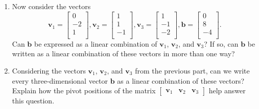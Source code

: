 \documentclass[12pt]{article}
\newcommand{\vs}[1]{\vspace{#1in}}
\newcommand{\bvec}{{\mathbf b}}
\newcommand{\vvec}{{\mathbf v}}
\begin{document}
\begin{enumerate}
  \vs{2}
\item Now consider the vectors
  $$
  \vvec_1 =
  \left[
    \begin{array}{r} 0 \\ -2 \\ 1 \\
    \end{array}
  \right], 
  \vvec_2 =
  \left[
    \begin{array}{r} 1 \\ 1 \\ -1 \\
    \end{array}
  \right], 
  \vvec_3 =
  \left[
    \begin{array}{r} 1 \\ -1 \\ -2 \\
    \end{array}
  \right], 
  \bvec   =
  \left[
    \begin{array}{r} 0 \\ 8 \\ -4 \\
    \end{array} \right].
  $$
  Can $\bvec$ be expressed as a linear combination of
  $\vvec_1$, $\vvec_2$, and $\vvec_3$?  If so,
  can $\bvec$ be written as a linear combination of these
  vectors in more than one way?
  \vs{2}

\item Considering the vectors $\vvec_1$,
  $\vvec_2$, and $\vvec_3$ from the previous part, can
  we write every three-dimensional vector $\bvec$ as
  a linear combination of these vectors?  Explain how the pivot
  positions of the matrix
  $
  \left[
    \begin{array}{rrr}
      \vvec_1 & \vvec_2 & \vvec_3
    \end{array}
  \right]$
  help answer this question. 


\end{enumerate}
\end{document}
